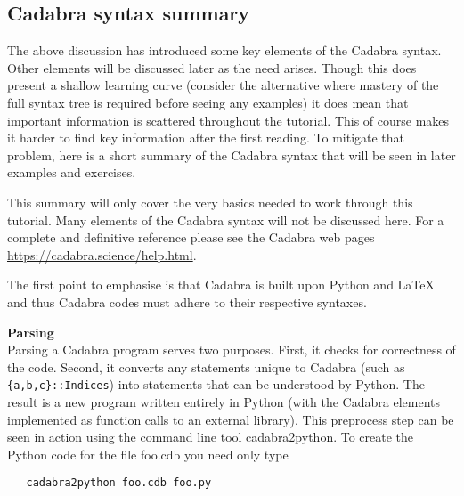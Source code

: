 \documentclass[a4paper,12pt]{article}
\numberwithin{equation}{section}%
\begin{document}
\subsection{Cadabra syntax summary}

The above discussion has introduced some key elements of the Cadabra syntax. Other elements
will be discussed later as the need arises. Though this does present a shallow learning curve
(consider the alternative where mastery of the full syntax tree is required before seeing
any examples) it does mean that important information is scattered throughout the tutorial.
This of course makes it harder to find key information after the first reading. To mitigate
that problem, here is a short summary of the Cadabra syntax that will be seen in later
examples and exercises.

This summary will only cover the very basics needed to work through this tutorial. Many
elements of the Cadabra syntax will not be discussed here. For a complete and definitive
reference please see the Cadabra web pages \url{https://cadabra.science/help.html}.

The first point to emphasise is that Cadabra is built upon Python and LaTeX and thus Cadabra
codes must adhere to their respective syntaxes.

{\bf Parsing}\\[5pt]
Parsing a Cadabra program serves two purposes. First, it checks for correctness of the code.
Second, it converts any statements unique to Cadabra (such as \verb|{a,b,c}::Indices|) into
statements that can be understood by Python. The result is a new program written entirely in
Python (with the Cadabra elements implemented as function calls to an external library).
This preprocess step can be seen in action using the command line tool
{\tts cadabra2python}. To create the Python code for the file {\tts foo.cdb} you need only
type
\bgroup
\lstset{numbers=none}
\begin{lstlisting}
   cadabra2python foo.cdb foo.py
\end{lstlisting}
\egroup
\end{document}
